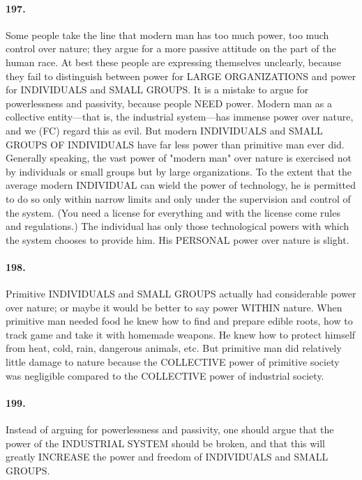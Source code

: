 \documentclass[12pt]{book}
\begin{document}
\paragraph{197.}  Some people take the line that modern man has too much power, too much control over nature; they argue for a more passive attitude on the part of the human race. At best these people are expressing themselves unclearly, because they fail to distinguish between power for LARGE ORGANIZATIONS and power for INDIVIDUALS and SMALL GROUPS. It is a mistake to argue for powerlessness and passivity, because people NEED power. Modern man as a collective entity---that is, the industrial system---has immense power over nature, and we (FC) regard this as evil. But modern INDIVIDUALS and SMALL GROUPS OF INDIVIDUALS have far less power than primitive man ever did. Generally speaking, the vast power of "modern man" over nature is exercised not by individuals or small groups but by large organizations. To the extent that the average modern INDIVIDUAL can wield the power of technology, he is permitted to do so only within narrow limits and only under the supervision and control of the system. (You need a license for everything and with the license come rules and regulations.) The individual has only those technological powers with which the system chooses to provide him. His PERSONAL power over nature is slight.


\paragraph{198.}  Primitive INDIVIDUALS and SMALL GROUPS actually had considerable power over nature; or maybe it would be better to say power WITHIN nature. When primitive man needed food he knew how to find and prepare edible roots, how to track game and take it with homemade weapons. He knew how to protect himself from heat, cold, rain, dangerous animals, etc. But primitive man did relatively little damage to nature because the COLLECTIVE power of primitive society was negligible compared to the COLLECTIVE power of industrial society.


\paragraph{199.}  Instead of arguing for powerlessness and passivity, one should argue that the power of the INDUSTRIAL SYSTEM should be broken, and that this will greatly INCREASE the power and freedom of INDIVIDUALS and SMALL GROUPS.
\end{document}
